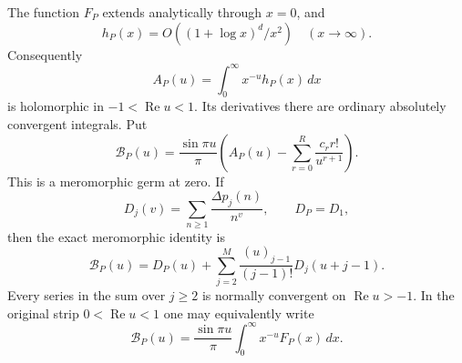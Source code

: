 \begin{theorem}
\label{mellin:main}
The function $F_P$ extends analytically through $x=0$, and
\[
 h_P(x)=O((1+\log x)^d/x^2)\quad(x\longrightarrow\infty).
\]
Consequently
\begin{equation}\label{mellin:A}
 A_P(u)=\int_0^\infty x^{-u}h_P(x)\,dx
\end{equation}
is holomorphic in $-1<\operatorname{Re}u<1$.  Its derivatives there
are ordinary absolutely convergent integrals.  Put
\begin{equation}\label{mellin:B}
 \mathcal B_P(u)=\frac{\sin\pi u}{\pi}
 \left(A_P(u)-\sum_{r=0}^{R}\frac{c_r r!}{u^{r+1}}\right).
\end{equation}
This is a meromorphic germ at zero.  If
\[
 D_j(v)=\sum_{n\ge1}\frac{\Delta p_j(n)}{n^v},\qquad D_P=D_1,
\]
then the exact meromorphic identity is
\begin{equation}\label{mellin:bridge}
 \boxed{\mathcal B_P(u)=D_P(u)+
 \sum_{j=2}^{M}\frac{(u)_{j-1}}{(j-1)!}D_j(u+j-1).}
\end{equation}
Every series in the sum over $j\ge2$ is normally convergent on
$\operatorname{Re}u>-1$.  In the original strip
$0<\operatorname{Re}u<1$ one may equivalently write
\begin{equation}\label{mellin:unsubtracted}
 \mathcal B_P(u)=\frac{\sin\pi u}{\pi}
                  \int_0^\infty x^{-u}F_P(x)\,dx.
\end{equation}
\end{theorem}

